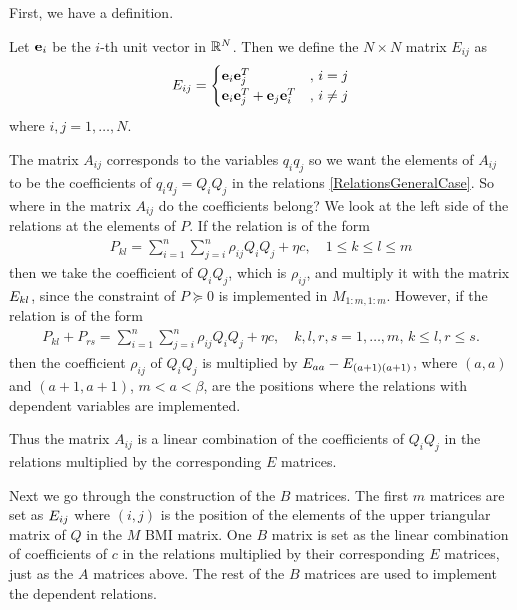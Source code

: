 \documentclass[a4paper,12pt,twoside,BCOR=10mm]{scrbook}
\begin{document}
First, we have a definition.
\begin{definition}
Let $\mathbf{e}_i$ be the $i$-th unit vector in $\mathbb{R}^{N}$. Then we define the $N\times N$ matrix $E_{ij}$ as
\begin{align*}
    E_{ij} = \begin{cases}
    \mathbf{e}_i \mathbf{e}_j^T &,\, i = j\\
    \mathbf{e}_i \mathbf{e}_j^T + \mathbf{e}_j \mathbf{e}_i^T &,\, i \neq j 
    \end{cases}
\end{align*}
where $i,j = 1, \ldots, N$.
\end{definition}


The matrix $A_{ij}$ corresponds to the variables $q_iq_j$ so we want the elements of $A_{ij}$ to be the coefficients of $q_iq_j = Q_iQ_j$ in the relations \eqref{RelationsGeneralCase}. So where in the matrix $A_{ij}$ do the coefficients belong? We look at the left side of the relations at the elements of $P$. If the relation is of the form
\fi
\begin{align*}
    P_{kl} = \sum_{i = 1}^n\sum_{j = i}^n \rho_{ij}Q_iQ_j + \eta c, \quad 1 \leq k \leq l \leq m
\end{align*}
then we take the coefficient of $Q_iQ_j$, which is $\rho_{ij}$, and multiply it with the matrix $E_{kl}$, since the constraint of $P \succeq 0$ is implemented in $M_{1:m, 1:m}$. However, if the relation is of the form
\fi
\begin{align*}
    P_{kl} + P_{rs} = \sum_{i = 1}^n\sum_{j = i}^n \rho_{ij}Q_iQ_j + \eta c, \quad k,l,r,s = 1, \ldots, m, \, k \leq l, r\leq s.
\end{align*}
then the coefficient $\rho_{ij}$ of $Q_i Q_j$ is multiplied by $E_{aa} - E_{(a+1)(a+1)}$, where $(a,a)$ and $(a+1,a+1)$, $m < a < \beta$, are the positions where the relations with dependent variables are implemented.

Thus the matrix $A_{ij}$ is a linear combination of the coefficients of $Q_iQ_j$ in the relations multiplied by the corresponding $E$ matrices.

Next we go through the construction of the $B$ matrices. The first $m$ matrices are set as $E_{ij}$ where $(i,j)$ is the position of the elements of the upper triangular matrix of $Q$ in the $M$ BMI matrix. One $B$ matrix is set as the linear combination of coefficients of $c$ in the relations multiplied by their corresponding $E$ matrices, just as the $A$ matrices above. The rest of the $B$ matrices are used to implement the dependent relations.
\end{document}
